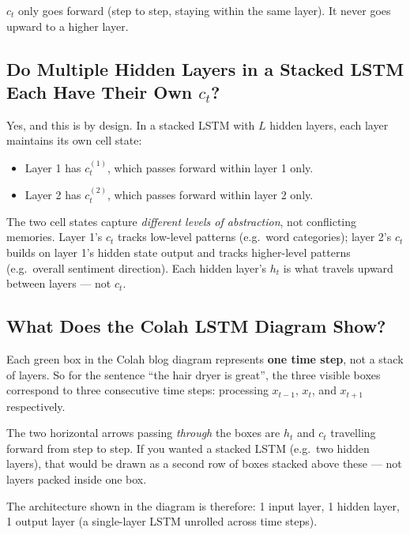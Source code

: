 $c_t$ only goes forward (step to step, staying within the same layer). It never goes
upward to a higher layer.

\subsection{Do Multiple Hidden Layers in a Stacked LSTM Each Have Their Own $c_t$?}

Yes, and this is by design. In a stacked LSTM with $L$ hidden layers, each layer
maintains its own cell state:

\begin{itemize}
    \item Layer 1 has $c_t^{(1)}$, which passes forward within layer 1 only.
    \item Layer 2 has $c_t^{(2)}$, which passes forward within layer 2 only.
\end{itemize}

The two cell states capture \emph{different levels of abstraction}, not conflicting
memories. Layer 1's $c_t$ tracks low-level patterns (e.g.\ word categories);
layer 2's $c_t$ builds on layer 1's hidden state output and tracks higher-level
patterns (e.g.\ overall sentiment direction). Each hidden layer's $h_t$ is what
travels upward between layers --- not $c_t$.

\subsection{What Does the Colah LSTM Diagram Show?}

Each green box in the Colah blog diagram represents \textbf{one time step}, not a
stack of layers. So for the sentence ``the hair dryer is great'', the three visible
boxes correspond to three consecutive time steps: processing $x_{t-1}$, $x_t$, and
$x_{t+1}$ respectively.

The two horizontal arrows passing \emph{through} the boxes are $h_t$ and $c_t$
travelling forward from step to step. If you wanted a stacked LSTM (e.g.\ two hidden
layers), that would be drawn as a second row of boxes stacked above these --- not
layers packed inside one box.

The architecture shown in the diagram is therefore: 1 input layer, 1 hidden layer,
1 output layer (a single-layer LSTM unrolled across time steps).

